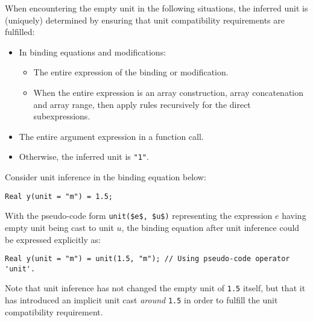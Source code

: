 When encountering the empty unit in the following situations, the inferred unit is (uniquely) determined by ensuring that unit compatibility requirements are fulfilled:
\begin{itemize}
\item
  In binding equations and modifications:
  \begin{itemize}
  \item The entire expression of the binding or modification.
  \item When the entire expression is an array construction, array concatenation and array range, then apply rules recursively for the direct subexpressions.
  \end{itemize}
\item
  The entire argument expression in a function call.
\item
  Otherwise, the inferred unit is \lstinline!"1"!.
\end{itemize}

\begin{example}
Consider unit inference in the binding equation below:
\begin{lstlisting}[language=modelica]
Real y(unit = "m") = 1.5;
\end{lstlisting}
With the pseudo-code form \lstinline!unit($e$, $u$)! representing the expression $e$ having empty unit being cast to unit $u$, the binding equation after unit inference could be expressed explicitly as:
\begin{lstlisting}[language=modelica]
Real y(unit = "m") = unit(1.5, "m"); // Using pseudo-code operator 'unit'.
\end{lstlisting}
Note that unit inference has not changed the empty unit of \lstinline!1.5! itself, but that it has introduced an implicit unit cast \emph{around} \lstinline!1.5! in order to fulfill the unit compatibility requirement.
\end{example}


